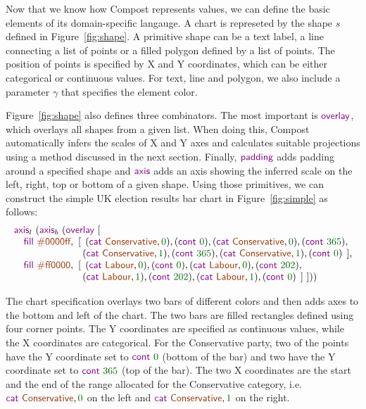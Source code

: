 \documentclass{jfp}
\newcommand{\num}[1]{\textcolor{numclr}{#1}}
\newcommand{\strf}[1]{\textnormal{\textcolor{strclr}{\sffamily #1}}}
\newcommand{\kvd}[1]{\textnormal{\textcolor{kvdclr}{\sffamily #1}}}
\begin{document}
Now that we know how Compost represents values, we can define the basic elements of its
domain-specific langauge. A chart is represeted by the shape $s$ defined in Figure~\ref{fig:shape}.
A primitive shape can be a text label, a line connecting a list of points or a filled polygon
defined by a list of points. The position of points is specified by X and Y coordinates,
which can be either categorical or continuous values. For text, line and polygon, we also include
a parameter $\gamma$ that specifies the element color.

Figure~\ref{fig:shape} also defines three combinators. The most important is $\kvd{overlay}$,
which overlays all shapes from a given list. When doing this, Compost automatically infers the
scales of X and Y axes and calculates suitable projections using a method discussed in the next
section. Finally, $\kvd{padding}$ adds padding around a specified shape and $\kvd{axis}$ adds
an axis showing the inferred scale on the left, right, top or bottom of a given shape.
Using those primitives, we can construct the simple UK election results bar chart in Figure~\ref{fig:simple} as follows:
%
\begin{equation*}
\begin{array}{l}
\kvd{axis}_l~(\kvd{axis}_b~(\kvd{overlay}~[\\
\quad \kvd{fill}~\strf{\#0000ff},
 ~[\;\,(\kvd{cat}~\strf{Conservative}, \num{0}), (\kvd{cont}~\num{0}), (\kvd{cat}~\strf{Conservative}, \num{0}), (\kvd{cont}~\num{365}),\\
\hspace{6.7em}\;(\kvd{cat}~\strf{Conservative}, \num{1}), (\kvd{cont}~\num{365}), (\kvd{cat}~\strf{Conservative}, \num{1}), (\kvd{cont}~\num{0})\;\,],\\
\quad \kvd{fill}~\strf{\#ff0000},
 ~[\;\,(\kvd{cat}~\strf{Labour}, \num{0}), (\kvd{cont}~\num{0}), (\kvd{cat}~\strf{Labour}, \num{0}), (\kvd{cont}~\num{202}),\\
\hspace{6.7em}\;(\kvd{cat}~\strf{Labour}, \num{1}), (\kvd{cont}~\num{202}), (\kvd{cat}~\strf{Labour}, \num{1}), (\kvd{cont}~\num{0})\,\;]~]))\\
\end{array}
\end{equation*}

\noindent
The chart specification overlays two bars of different colors and then adds axes to the bottom and
left of the chart. The two bars are filled rectangles defined using four corner points. The Y
coordinates are specified as continuous values, while the X coordinates are categorical. For
the Conservative party, two of the points have the Y coordinate set to $\kvd{cont}~\num{0}$ (bottom of the bar)
and two have the Y coordinate set to $\kvd{cont}~\num{365}$ (top of the bar). The two X coordinates
are the start and the end of the range allocated for the \strf{Conservative} category,
i.e.~$\kvd{cat}~\strf{Conservative}, \num{0}$ on the left and $\kvd{cat}~\strf{Conservative}, \num{1}$
on the right.
\end{document}
